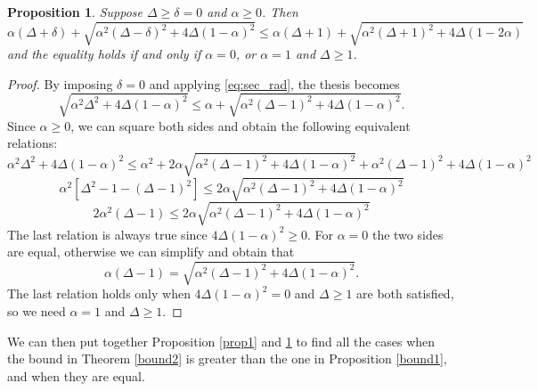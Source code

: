 \documentclass[a4paper,10pt]{article}
\theoremstyle{definition}
\theoremstyle{plain}
\newtheorem{proposition}{Proposition}
\begin{document}
\begin{proposition}
 \label{prop2}   Suppose $\Delta \ge \delta =0$ and $\alpha\ge 0$. Then 
        \[
    \alpha(\Delta + \delta) +\sqrt{\alpha^2(\Delta-\delta)^2 + 4\Delta(1-\alpha)^2}
    \le 
     \alpha(\Delta + 1) +\sqrt{\alpha^2(\Delta+1)^2 + 4\Delta(1-2\alpha)}
    \]
    and the equality holds if and only if $\alpha = 0$, or $\alpha = 1$ and $\Delta  \ge  1$. 
\end{proposition}
\begin{proof}
   By imposing $\delta =0$ and applying \eqref{eq:sec_rad}, the thesis becomes    \[
     \sqrt{\alpha^2\Delta^2 + 4\Delta(1-\alpha)^2}
    \le 
     \alpha +\sqrt{\alpha^2(\Delta-1)^2 + 4\Delta(1-\alpha)^2}.
    \]
Since $\alpha\ge 0$, we can square both sides and obtain the following equivalent relations:
\[
     \alpha^2\Delta^2 + 4\Delta(1-\alpha)^2
    \le 
    \alpha^2 + 
     2\alpha \sqrt{\alpha^2(\Delta-1)^2 + 4\Delta(1-\alpha)^2} + 
     \alpha^2(\Delta-1)^2 + 4\Delta(1-\alpha)^2
    \]
\[
  \alpha^2
  [ \Delta^2  - 1 -  (\Delta-1)^2]
    \le 
      2\alpha \sqrt{\alpha^2(\Delta-1)^2 + 4\Delta(1-\alpha)^2}
\]
\[
  2\alpha^2  (\Delta-1)
    \le 
      2\alpha \sqrt{\alpha^2(\Delta-1)^2 + 4\Delta(1-\alpha)^2}
\]
The last relation is always true since $ 4\Delta(1-\alpha)^2\ge 0$. 
For $\alpha=0$ the two sides are equal, otherwise we can simplify and obtain that
\[
 \alpha (\Delta-1)
    = 
      \sqrt{\alpha^2(\Delta-1)^2 + 4\Delta(1-\alpha)^2}.
\]
The last relation holds only when $4\Delta(1-\alpha)^2 = 0$ and $\Delta \ge 1$ are both satisfied, so we need $\alpha = 1$ and $\Delta \ge 1$. 
\end{proof}


We can then put together Proposition \ref{prop1} and \ref{prop2} to find all the cases when the bound in Theorem \ref{bound2}  is greater than the one in Proposition \ref{bound1}, and when they are equal.
\end{document}
